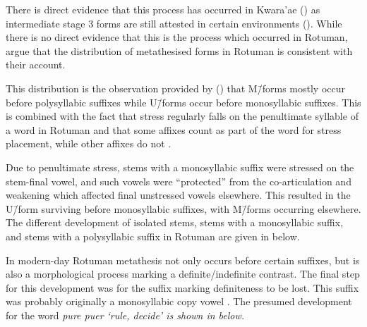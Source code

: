 There is direct evidence that this process has occurred in Kwara'ae ()
as intermediate stage 3 forms are still attested in certain environments ().
While there is no direct evidence that this is the process which occurred in Rotuman,
\cite{blga98} argue that the distribution of metathesised forms in Rotuman
is consistent with their account.

This distribution is the observation provided by \cite{haki98} ()
that M\=/forms mostly occur before polysyllabic suffixes
while U\=/forms occur before monosyllabic suffixes.
This is combined with the fact that stress regularly falls
on the penultimate syllable of a word in Rotuman and that
some affixes count as part of the word for stress placement,
while other affixes do not \citep[75]{ch40}.

Due to penultimate stress, stems with a monosyllabic suffix 
were stressed on the stem-final vowel,
and such vowels were ``protected'' from the co-articulation
and weakening which affected final unstressed vowels elsewhere.
This resulted in the U\=/form surviving before monosyllabic suffixes,
with M\=/forms occurring elsewhere.
The different development of isolated stems,
stems with a monosyllabic suffix, and stems with a
polysyllabic suffix in Rotuman are given in  below.

\begin{exe}
	\label{ex:DevRotShoFor}
\end{exe}

In modern-day Rotuman metathesis not only occurs before certain
suffixes, but is also a morphological process marking 
a definite/indefinite contrast.
The final step for this development was for the suffix marking definiteness to be lost.
This suffix was probably originally a monosyllabic copy vowel \citep{gr59,blga98}.
The presumed development for the word \it{pure {\ra} puer} `rule, decide'
is shown in  below.

